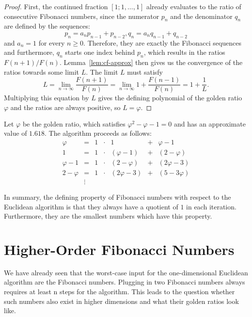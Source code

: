 \begin{proof}
  First, the continued fraction $[1; 1, …, 1]$ already evaluates to the ratio of consecutive Fibonacci numbers,
  since the numerator $p_n$ and the denominator $q_n$ are defined by the sequences:
  \[
    p_n = a_n p_{n-1} + p_{n-2}, q_n = a_n q_{n-1} + q_{n-2}
  \]
  and $a_n = 1$ for every $n ≥ 0$.
  Therefore, they are exactly the Fibonacci sequences and furthermore, $q_n$ starts one index behind $p_n$,
  which results in the ratios $F(n+1)/F(n)$.
  Lemma~\vref{lem:cf-approx} then gives us the convergence of the ratios towards some limit $L$.
  The limit $L$ must satisfy
  \[
    L = \lim_{n → ∞} \frac{F(n+1)}{F(n)} = \lim_{n → ∞} 1 + \frac{F(n-1)}{F(n)} = 1 + \frac{1}{L}.
  \]
  Multiplying this equation by $L$ gives the defining polynomial of the golden ratio $φ$
  and the ratios are always positive, so $L = φ$.
\end{proof}

\begin{example}
  Let $φ$ be the golden ratio,
  which satisfies $φ^2 - φ - 1 = 0$
  and has an approximate value of $1.618$.
  The algorithm proceeds as follows:
  \[
    \begin{array}{rclcrcl}
      φ & = & 1 & · & 1   & + & φ - 1 \\
         1 & = & 1 & · & (φ - 1) & + & (2 - φ) \\
       φ - 1 & = & 1 & · & (2 - φ) & + & (2φ - 3) \\
       2 - φ & = & 1 & · & (2φ - 3) & + & (5 - 3φ) \\
       & \vdots &
    \end{array}
  \]
\end{example}

In summary,
the defining property of Fibonacci numbers with respect to the Euclidean
algorithm is that they always have a quotient of $1$ in each iteration.
Furthermore, they are the smallest numbers which have this property.

\section{Higher-Order Fibonacci Numbers}

We have already seen that the worst-case input for the one-dimensional
Euclidean algorithm are the Fibonacci numbers.
Plugging in two Fibonacci numbers always requires at least n steps for the
algorithm.
This leads to the question whether such numbers also exist in higher dimensions
and what their golden ratios look like.

